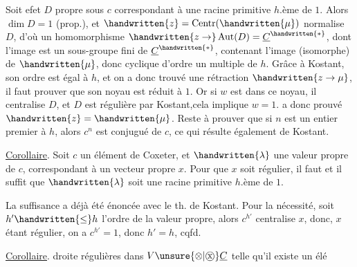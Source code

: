 Soit  efet $D$  propre sous $c$ correspondant à une racine primitive $h$.ème de $1$. Alors $\dim D=1$ (prop.), et $\handwritten{z}=\operatorname{Centr}(\handwritten{\mu})$ normalise $D$, d'où un homomorphisme $\handwritten{z\to}\operatorname{Aut}(D)=\underline{C}^{\handwritten{*}}$, dont l'image est un sous-groupe fini de $\underline{C}^{\handwritten{*}}$, contenant l'image (isomorphe) de $\handwritten{\mu}$, donc cyclique d'ordre un multiple de $h$. Grâce à Kostant, son ordre est égal à $h$, et on a donc trouvé une rétraction $\handwritten{z\to\mu}$, il faut prouver que son noyau est réduit à $1$. Or si $w$ est dans ce noyau, il  centralise $D$, et  $D$ est régulière par Kostant,cela implique $w=1$.  a donc prouvé $\handwritten{z}=\handwritten{\mu}$. Reste à prouver que si $n$ est un entier premier à $h$, alors $c^n$ est conjugué de $c$, ce qui résulte également de Kostant.

\uline{Corollaire}. Soit $c$ un élément de Coxeter, et $\handwritten{\lambda}$ une valeur propre de $c$, correspondant à un vecteur propre $x$. Pour que $x$ soit régulier, il faut et il suffit que $\handwritten{\lambda}$ soit une racine primitive $h$.ème de $1$.

La suffisance a déjà été énoncée avec le th. de Kostant. Pour la nécessité, soit $h'\handwritten{\leq}h$ l'ordre de la valeur propre, alors $c^{h'}$ centralise $x$, donc, $x$ étant régulier, on a $c^{h'}=1$, donc $h'=h$, cqfd.

\uline{Corollaire}.   droite régulières dans $V\unsure{\otimes|\mathbin{\text{\textcircled{x}}}}\underline{C}$ telle qu'il existe un élé%
